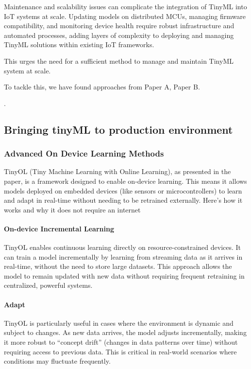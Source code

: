 \documentclass[twocolumn]{article}
\begin{document}
Maintenance and scalability issues can complicate the integration of TinyML into IoT systems at scale. Updating models on distributed MCUs, managing firmware compatibility, and monitoring device health require robust infrastructure and automated processes, adding layers of complexity to deploying and managing TinyML solutions within existing IoT frameworks.

This urges the need for a sufficient method to manage and maintain TinyML system at scale.

To tackle this, we have found approaches from Paper A, Paper B.

\cite{hussein_original_2024, paul_rethinking_2021, de_prado_robustifying_2020,ren_synergy_2021,roshan_adaptive_2021}.


\subsection{Bringing tinyML to production environment}
\subsubsection{Advanced On Device Learning Methods }
TinyOL (Tiny Machine Learning with Online Learning), as presented in the paper, is a framework designed to enable on-device learning. This means it allows models deployed on embedded devices (like sensors or microcontrollers) to learn and adapt in real-time without needing to be retrained externally. Here’s how it works and why it does not require an internet 
\paragraph{On-device Incremental Learning} TinyOL enables continuous learning directly on resource-constrained devices. It can train a model incrementally by learning from streaming data as it arrives in real-time, without the need to store large datasets. This approach allows the model to remain updated with new data without requiring frequent retraining in centralized, powerful systems.
\paragraph{Adapt} TinyOL is particularly useful in cases where the environment is dynamic and subject to changes. As new data arrives, the model adjusts incrementally, making it more robust to “concept drift” (changes in data patterns over time) without requiring access to previous data. This is critical in real-world scenarios where conditions may fluctuate frequently. 
\end{document}
